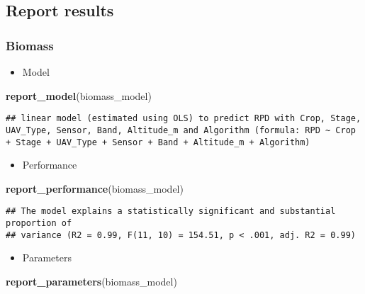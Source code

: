 \documentclass[
]{article}
\newenvironment{Shaded}{\begin{snugshade}}{\end{snugshade}}
\newcommand{\FunctionTok}[1]{\textcolor[rgb]{0.13,0.29,0.53}{\textbf{#1}}}
\newcommand{\NormalTok}[1]{#1}
\providecommand{\tightlist}{%
  \setlength{\itemsep}{0pt}\setlength{\parskip}{0pt}}
\begin{document}
\hypertarget{report-results}{%
\subsection{Report results}\label{report-results}}

\hypertarget{biomass-1}{%
\subsubsection{Biomass}\label{biomass-1}}

\begin{itemize}
\tightlist
\item
  Model
\end{itemize}

\begin{Shaded}
\begin{Highlighting}[]
\FunctionTok{report\_model}\NormalTok{(biomass\_model)}
\end{Highlighting}
\end{Shaded}

\begin{verbatim}
## linear model (estimated using OLS) to predict RPD with Crop, Stage, UAV_Type, Sensor, Band, Altitude_m and Algorithm (formula: RPD ~ Crop + Stage + UAV_Type + Sensor + Band + Altitude_m + Algorithm)
\end{verbatim}

\begin{itemize}
\tightlist
\item
  Performance
\end{itemize}

\begin{Shaded}
\begin{Highlighting}[]
\FunctionTok{report\_performance}\NormalTok{(biomass\_model)}
\end{Highlighting}
\end{Shaded}

\begin{verbatim}
## The model explains a statistically significant and substantial proportion of
## variance (R2 = 0.99, F(11, 10) = 154.51, p < .001, adj. R2 = 0.99)
\end{verbatim}

\begin{itemize}
\tightlist
\item
  Parameters
\end{itemize}

\begin{Shaded}
\begin{Highlighting}[]
\FunctionTok{report\_parameters}\NormalTok{(biomass\_model)}
\end{Highlighting}
\end{Shaded}
\end{document}
